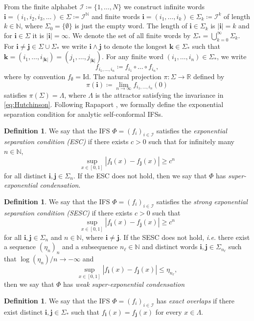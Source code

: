 \documentclass[11pt,]{article}
\def\cref#1{\ref{#1}}%
\theoremstyle{definition}
\newtheorem{definition}[theorem]{Definition}
\theoremstyle{remark}
\renewcommand{\Bbb}[1]{\mathbb{#1}}
\newcommand{\bbN}{{\Bbb N}}         %
\newcommand{\bbR}{{\Bbb R}}        %
\newcommand{\0}{\mathbf{0}}
\newcommand{\ie}{{\it i.e.}\/ }
\newcommand{\bi}{\mathbf{i}}
\newcommand{\bj}{\mathbf{j}}
\numberwithin{equation}{section}
\begin{document}
From the finite alphabet $\mathcal{I}\coloneqq\{1,\ldots,N\}$ we construct infinite words
$\bi=(i_1,i_2,i_3,\dots) \in\Sigma \coloneqq \mathcal{I}^{\bbN}$ and finite words
$\bi=(i_1,\ldots,i_k)\in \Sigma_k\coloneqq \mathcal{I}^k$ of length $k\in\mathbb{N}$, where
$\Sigma_0=\{\emptyset\}$ is just the empty word. The length of $\bi\in\Sigma_k$ is $|\bi|=k$ and for
$\bi\in\Sigma$ it is $|\bi|=\infty$. We denote the set of all finite words by $\Sigma_* =
\bigcup_{k=0}^\infty \Sigma_k$. For $\bi\neq\bj\in\Sigma\cup\Sigma_*$ we write $\bi\wedge\bj$
to denote the longest $\mathbf{k}\in\Sigma_*$ such that $\mathbf{k} = (i_1,\dots,
i_{|\mathbf{k}|})=(j_1,\dots,j_{|\mathbf{k}|})$.
For any finite word $(i_1,\dots,i_n)\in\Sigma_*$, we write
\[
f_{i_1,\dots,i_n}\coloneqq f_{i_1}\circ \dots \circ f_{i_n},
\]
where by convention $f_{\emptyset}=\mathrm{Id}$. The natural projection $\pi\colon\Sigma\to\bbR$ defined by
\begin{equation}\label{eq:natProj}
\pi(\bi)\coloneqq\lim_{n\to\infty}f_{i_1,\dots,i_n}(0)
\end{equation}
satisfies $\pi(\Sigma)=\Lambda$, where $\Lambda$ is the attractor satisfying the invariance in
\cref{eq:Hutchinson}. 
Following Rapaport \cite{Rapaport_SelfConfESC25arXiv}, we formally define the exponential separation
condition for analytic self-conformal IFSs.
\begin{definition}
  We say that the IFS $\Phi=(f_i)_{i\in\mathcal{I}}$ 
  satisfies the \emph{exponential separation condition (ESC)} if there exists $c>0$ such that for
  infinitely many $n\in\mathbb{N}$,
  \[
    \sup_{x\in[0,1]} |f_{\bi}(x)-f_{\bj}(x)| \geq c^n
  \]
  for all distinct $\bi,\bj\in\Sigma_n$. If the ESC does not hold,
  then we say that $\Phi$ has \emph{super-exponential condensation}.	
\end{definition}
\begin{definition}\label{def:SESC}
  We say that the IFS $\Phi=(f_i)_{i\in\mathcal{I}}$ 
  satisfies the \emph{strong exponential separation condition (SESC)} if there exists $c>0$ such that
  \[
    \sup_{x\in[0,1]} |f_{\bi}(x)-f_{\bj}(x)| \geq c^n
  \]
  for all $\bi,\bj\in\Sigma_n$ and $n\in\bbN$, where $\bi\neq\bj$. 
  If the SESC does not hold, \ie there exist a sequence $(\eta_n)_n$ and a subsequence
  $n_{\ell}\in\bbN$ and distinct words $\bi,\bj\in\Sigma_{n_\ell}$ such that
  $\log(\eta_n)/n\to-\infty$ and
  \[
    \sup_{x\in[0,1]}|f_{\bi}(x)-f_{\bj}(x)| \leq \eta_{n_\ell},
  \]
  then we say that $\Phi$ has \emph{weak super-exponential condensation}
\end{definition}
\begin{definition}
  We say that the IFS $\Phi=(f_i)_{i\in\mathcal{I}}$ 
 has \emph{exact overlaps} if there exist distinct $\bi,\bj\in\Sigma_*$ such that
 $f_{\bi}(x)=f_{\bj}(x)$ for every $x\in\Lambda$. 
\end{definition}
\end{document}

